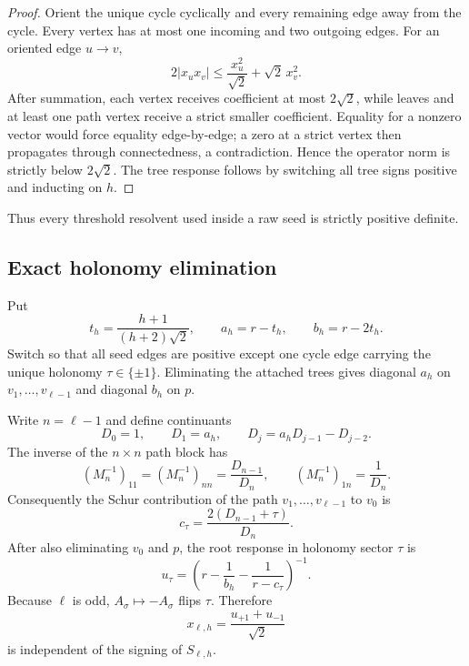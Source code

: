 \documentclass[11pt]{article}
\newcommand{\sgn}{\sigma}
\begin{document}
\begin{proof}
Orient the unique cycle cyclically and every remaining edge away from the cycle.  Every vertex has at most one incoming and two outgoing edges.  For an oriented edge $u\to v$,
\[
 2|x_ux_v|\le\frac{x_u^2}{\sqrt2}+\sqrt2\,x_v^2.
\]
After summation, each vertex receives coefficient at most $2\sqrt2$, while leaves and at least one path vertex receive a strict smaller coefficient.  Equality for a nonzero vector would force equality edge-by-edge; a zero at a strict vertex then propagates through connectedness, a contradiction.  Hence the operator norm is strictly below $2\sqrt2$.  The tree response follows by switching all tree signs positive and inducting on $h$.
\end{proof}

Thus every threshold resolvent used inside a raw seed is strictly positive definite.

\subsection{Exact holonomy elimination}

Put
\begin{equation}\label{eq:tab}
 t_h=\frac{h+1}{(h+2)\sqrt2},\qquad
 a_h=r-t_h,\qquad
 b_h=r-2t_h.
\end{equation}
Switch so that all seed edges are positive except one cycle edge carrying the unique holonomy $\tau\in\{\pm1\}$.  Eliminating the attached trees gives diagonal $a_h$ on $v_1,\ldots,v_{\ell-1}$ and diagonal $b_h$ on $p$.

Write $n=\ell-1$ and define continuants
\begin{equation}\label{eq:Drec}
 D_0=1,\qquad D_1=a_h,\qquad
 D_j=a_hD_{j-1}-D_{j-2}.
\end{equation}
The inverse of the $n\times n$ path block has
\[
 (M_n^{-1})_{11}=(M_n^{-1})_{nn}=\frac{D_{n-1}}{D_n},
 \qquad
 (M_n^{-1})_{1n}=\frac1{D_n}.
\]
Consequently the Schur contribution of the path $v_1,\ldots,v_{\ell-1}$ to $v_0$ is
\begin{equation}\label{eq:ctau}
 c_\tau=\frac{2(D_{n-1}+\tau)}{D_n}.
\end{equation}
After also eliminating $v_0$ and $p$, the root response in holonomy sector $\tau$ is
\begin{equation}\label{eq:utau}
 u_\tau
 =\left(r-\frac1{b_h}-\frac1{r-c_\tau}\right)^{-1}.
\end{equation}
Because $\ell$ is odd, $A_\sgn\mapsto-A_\sgn$ flips $\tau$.  Therefore
\begin{equation}\label{eq:xellh}
 \boxed{
 x_{\ell,h}
 =\frac{u_{+1}+u_{-1}}{\sqrt2}}
\end{equation}
is independent of the signing of $S_{\ell,h}$.
\end{document}
